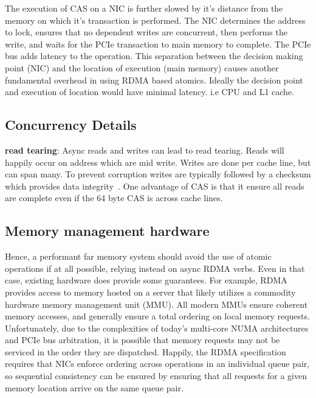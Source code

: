 The execution of CAS on a NIC is further slowed by it's distance from the memory
on which it's transaction is performed. The NIC determines the address to lock,
ensures that no dependent writes are concurrent, then performs the write, and
waits for the PCIe transaction to main memory to complete. The PCIe bus adds
latency to the operation. This separation between the decision making point
(NIC) and the location of execution (main memory) causes another fundamental
overhead in using RDMA based atomics. Ideally the decision point and execution
of location would have minimal latency. i.e CPU and L1 cache.

\subsection{Concurrency Details}
\textbf{read tearing}: Async reads and writes can lead to read tearing. Reads
will happily occur on address which are mid write. Writes are done per cache
line, but can span many. To prevent corruption writes are typically followed by
a checksum which provides data integrity~\cite{pilaf,clover}. One advantage of CAS is
that it ensure all reads are complete even if the 64 byte CAS is across cache
lines.

\subsection{Memory management hardware}

Hence, a performant far memory system should avoid the use of atomic operations
if at all possible, relying instead on async RDMA verbs.  Even in that case,
existing hardware does provide some guarantees.  For example, RDMA provides
access to memory hosted on a server that likely utilizes a commodity hardware
memory management unit (MMU).  All modern MMUs ensure coherent memory accesses,
and generally ensure a total ordering on local memory requests.  Unfortunately,
due to the complexities of today's multi-core NUMA architectures and PCIe bus
arbitration, it is possible that memory requests may not be serviced in the
order they are dispatched. Happily, the RDMA specification requires that NICs
enforce ordering across operations in an individual queue pair, so sequential
consistency can be ensured by ensuring that all requests for a given memory
location arrive on the same queue pair.


